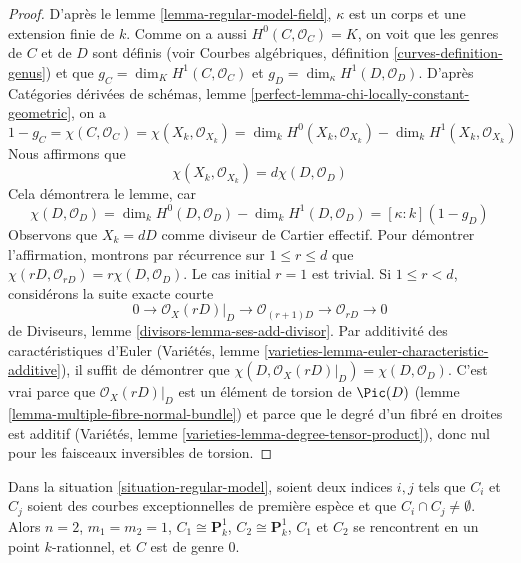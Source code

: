 \begin{proof}
D'après le lemme \ref{lemma-regular-model-field}, $\kappa$ est un corps
et une extension finie de $k$. Comme on a aussi $H^0(C, \mathcal{O}_C) = K$,
on voit que les genres de $C$ et de $D$ sont définis (voir
Courbes algébriques, définition \ref{curves-definition-genus}) et que
$g_C = \dim_K H^1(C, \mathcal{O}_C)$ et
$g_D = \dim_\kappa H^1(D, \mathcal{O}_D)$.
D'après Catégories dérivées de schémas, lemme
\ref{perfect-lemma-chi-locally-constant-geometric},
on a
$$
1 - g_C = \chi(C, \mathcal{O}_C) =
\chi(X_k, \mathcal{O}_{X_k}) = \dim_k H^0(X_k, \mathcal{O}_{X_k})
- \dim_k H^1(X_k, \mathcal{O}_{X_k})
$$
Nous affirmons que
$$
\chi(X_k, \mathcal{O}_{X_k}) = d \chi(D, \mathcal{O}_D)
$$
Cela démontrera le lemme, car
$$
\chi(D, \mathcal{O}_D) =
\dim_k H^0(D, \mathcal{O}_D) - \dim_k H^1(D, \mathcal{O}_D) =
[\kappa : k](1 - g_D)
$$
Observons que $X_k = dD$ comme diviseur de Cartier effectif.
Pour démontrer l'affirmation, montrons par récurrence sur $1 \leq r \leq d$ que
$\chi(rD, \mathcal{O}_{rD}) = r \chi(D, \mathcal{O}_D)$.
Le cas initial $r = 1$ est trivial. Si $1 \leq r < d$, considérons
la suite exacte courte
$$
0 \to \mathcal{O}_X(rD)|_D \to \mathcal{O}_{(r + 1)D} \to
\mathcal{O}_{rD} \to 0
$$
de Diviseurs, lemme \ref{divisors-lemma-ses-add-divisor}. Par additivité
des caractéristiques d'Euler
(Variétés, lemme \ref{varieties-lemma-euler-characteristic-additive}),
il suffit de démontrer que
$\chi(D, \mathcal{O}_X(rD)|_D) = \chi(D, \mathcal{O}_D)$.
C'est vrai parce que $\mathcal{O}_X(rD)|_D$ est un élément de torsion
de $\Pic(D)$ (lemme \ref{lemma-multiple-fibre-normal-bundle})
et parce que le degré d'un fibré en droites est additif
(Variétés, lemme \ref{varieties-lemma-degree-tensor-product}),
donc nul pour les faisceaux inversibles de torsion.
\end{proof}

\begin{lemma}
\label{lemma-exceptional-curves-dont-meet}
Dans la situation \ref{situation-regular-model}, soient deux indices $i, j$
tels que $C_i$ et $C_j$ soient des courbes exceptionnelles de première espèce
et que $C_i \cap C_j \not = \emptyset$. Alors
$n = 2$, $m_1 = m_2 = 1$, $C_1 \cong \mathbf{P}^1_k$,
$C_2 \cong \mathbf{P}^1_k$, $C_1$ et $C_2$ se rencontrent en un point $k$-rationnel,
et $C$ est de genre $0$.
\end{lemma}

